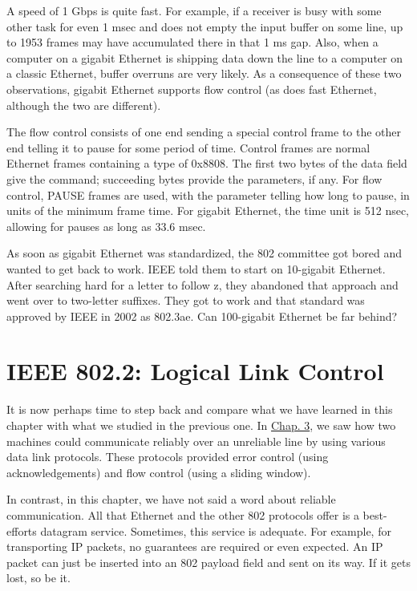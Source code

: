 A speed of 1 Gbps is quite fast. For example, if a receiver is busy with
some other task for even 1 msec and does not empty the input buffer on
some line, up to 1953 frames may have accumulated there in that 1 ms
gap. Also, when a computer on a gigabit Ethernet is shipping data down
the line to a computer on a classic Ethernet, buffer overruns are very
likely. As a consequence of these two observations, gigabit Ethernet
supports flow control (as does fast Ethernet, although the two are
different).

The flow control consists of one end sending a special control frame to
the other end telling it to pause for some period of time. Control
frames are normal Ethernet frames containing a type of 0x8808. The first
two bytes of the data field give the command; succeeding bytes provide
the parameters, if any. For flow control, PAUSE frames are used, with
the parameter telling how long to pause, in units of the minimum frame
time. For gigabit Ethernet, the time unit is 512 nsec, allowing for
pauses as long as 33.6 msec.

As soon as gigabit Ethernet was standardized, the 802 committee got
bored and wanted to get back to work. IEEE told them to start on
10-gigabit Ethernet. After searching hard for a letter to follow z, they
abandoned that approach and went over to two-letter suffixes. They got
to work and that standard was approved by IEEE in 2002 as 802.3ae. Can
100-gigabit Ethernet be far behind?

\protect\hypertarget{0130661023_ch04lev1sec3.htmlux5cux23ch04lev2sec17}{}{}

\section{IEEE 802.2: Logical Link Control}

It is now perhaps time to step back and compare what we have learned in
this chapter with what we studied in the previous one. In
\protect\hyperlink{0130661023_ch03.htmlux5cux23ch03}{Chap. 3}, we saw
how two machines could communicate reliably over an unreliable line by
using various data link protocols. These protocols provided error
control (using acknowledgements) and flow control (using a sliding
window).

In contrast, in this chapter, we have not said a word about reliable
communication. All that Ethernet and the other 802 protocols offer is a
best-efforts datagram service. Sometimes, this service is adequate. For
example, for transporting IP packets, no guarantees are required or even
expected. An IP packet can just be inserted into an 802 payload field
and sent on its way. If it gets lost, so be it.

